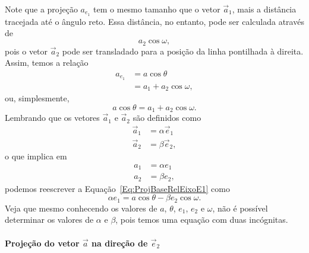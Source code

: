 Note que a projeção $a_{e_1}$ tem o mesmo tamanho que o vetor $\vec{a}_1$, mais a distância tracejada até o ângulo reto. Essa distância, no entanto, pode ser calculada através de 
\begin{displaymath}
    a_2\cos\omega,
\end{displaymath}
%
pois o vetor $\vec{a}_2$ pode ser transladado para a posição da linha pontilhada à direita. Assim, temos a relação
\begin{align}
    a_{e_1} &= a\cos\theta \\
    &= a_1 + a_2\cos\omega,
\end{align}
%
ou, simplesmente,
\begin{equation}\label{Eq:ProjBaseRelEixoE1}
    a\cos\theta = a_1 + a_2\cos\omega.
\end{equation}
%
Lembrando que os vetores $\vec{a}_1$ e $\vec{a}_2$ são definidos como
\begin{subequations}\label{Eq:RelVecsA1A2}
\begin{align}
    \vec{a}_1 &= \alpha \vec{e}_1 \\
    \vec{a}_2 &= \beta \vec{e}_2,
\end{align}
\end{subequations}
%
o que implica em
\begin{subequations}\label{Eq:RelModulosA1A2}
\begin{align}
    a_1 &= \alpha e_1 \\
    a_2 &= \beta e_2,
\end{align}
\end{subequations}
%
podemos reescrever a Equação~\eqref{Eq:ProjBaseRelEixoE1} como
\begin{equation}
    \alpha e_1 = a\cos\theta - \beta e_2 \cos\omega.
\end{equation}
%
Veja que mesmo conhecendo os valores de $a$, $\theta$, $e_1$, $e_2$ e $\omega$, não é possível determinar os valores de $\alpha$ e $\beta$, pois temos uma equação com duas incógnitas.

\paragraph{Projeção do vetor $\vec{a}$ na direção de $\vec{e}_2$}

